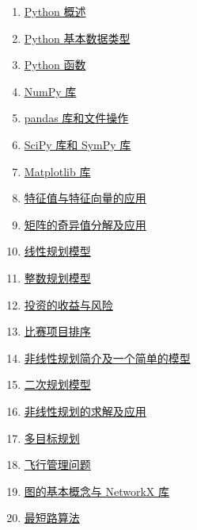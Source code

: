 \documentclass[11pt]{article}
\begin{document}
\begin{multicols}{2}
	\begin{enumerate}
		\item \href{https://mp.weixin.qq.com/s/xP2umhBM5-rcTfOKwtx2eg}{Python 概述}	%
		\item \href{https://mp.weixin.qq.com/s/uzrtG8uaqkCvYqcCHHRLYQ}{Python 基本数据类型}	%
		\item \href{https://mp.weixin.qq.com/s/bLEkk0pBaC2kFp4-ShA0PQ}{Python 函数}	%
		\item \href{https://mp.weixin.qq.com/s/ZRljuX5eUqLJyYaD-1wL8Q}{NumPy 库}	%
		\item \href{https://mp.weixin.qq.com/s/rj6KBsRazCHiePuFn1azYg}{pandas 库和文件操作}	%
		\item \href{https://mp.weixin.qq.com/s/C7-I7NSruF2aYesxDNDM4A}{SciPy 库和 SymPy 库}	%
		\item \href{https://mp.weixin.qq.com/s/E7hfA427tjI-eWHCRTN4nA}{Matplotlib 库}	%
		\item \href{https://mp.weixin.qq.com/s/KL4D0z_7qDb7R9pF8jVidg}{特征值与特征向量的应用}	%
		\item \href{https://mp.weixin.qq.com/s/-TvafaC1PMgk9A8y9BkGbg}{矩阵的奇异值分解及应用}	%
		\item \href{https://mp.weixin.qq.com/s/gE_EK20mgEb3HbNuMDfYDA}{线性规划模型}	%
		\item \href{https://mp.weixin.qq.com/s/8tYvLB6FMDcCKHcGbSs0Ow}{整数规划模型}	%
		\item \href{https://mp.weixin.qq.com/s/l4BaducU7KK-7M8H20qvtA}{投资的收益与风险}	%
		\item \href{https://mp.weixin.qq.com/s/-CzDRm3xJpK9Wi4wgl1pcw}{比赛项目排序}	%
		\item \href{https://mp.weixin.qq.com/s/OJ21ryi-kZNFMjWtXqDyaw}{非线性规划简介及一个简单的模型}	%
		\item \href{https://mp.weixin.qq.com/s/eK2P5n2aGbhoDYH86k0iAQ}{二次规划模型}	%
		\item \href{https://mp.weixin.qq.com/s/vnlAESDL7E8vN-DtQ_lfVw}{非线性规划的求解及应用}	%
		\item \href{https://mp.weixin.qq.com/s/Yf255W4zY0S2G5H2j4pf6g}{多目标规划}	%
		\item \href{https://mp.weixin.qq.com/s/XUmraa2BVsrrQvJKcDeZJg}{飞行管理问题}	%
		\item \href{https://mp.weixin.qq.com/s/udPOS2Ehp27zTPGwcBMjhQ}{图的基本概念与 NetworkX 库}	%
		\item \href{https://mp.weixin.qq.com/s/g_zNUicd7_90s7UL5Vpjig}{最短路算法}	%

\end{enumerate}
\end{multicols}
\end{document}
